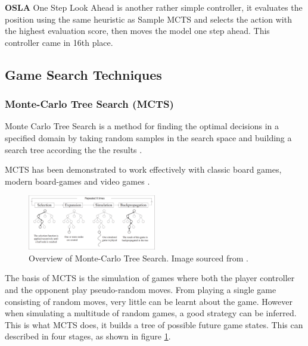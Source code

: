 \documentclass[journal]{IEEEtran}
\begin{document}
		\textbf{OSLA}
			One Step Look Ahead is another rather simple controller, it evaluates the position using the same heuristic as Sample MCTS and selects the action with the highest evaluation score, then moves the model one step ahead. This controller came in 16th place.






		

		




	
		
	
	\subsection{Game Search Techniques}
		
		\subsubsection{Monte-Carlo Tree Search (MCTS) }\label{sssec:MCTS}

		Monte Carlo Tree Search is a method for finding the optimal decisions in a specified domain by taking random samples in the search space and building a search tree according the the results \cite{browne2012survey}. 
		
		MCTS has been demonstrated to work effectively with classic board games, modern board-games and video games \cite{chaslot2008monte, pepels2014real}.

		\begin{figure}[h]
		    \centering
		    \includegraphics[width=0.5\textwidth]{MCTSProcess}
		    \caption{Overview of Monte-Carlo Tree Search. Image sourced from \cite{chaslot2008monte}. }
		    \label{fig:MCTS1}
		\end{figure}
		

		The basis of MCTS is the simulation of games where both the player controller and the opponent play pseudo-random moves. From playing a single game consisting of random moves, very little can be learnt about the game. However when simulating a multitude of random games, a good strategy can be inferred. This is what MCTS does, it builds a tree of possible future game states. This can described in four stages, as shown in figure \ref{fig:MCTS1}.
		
\end{document}
